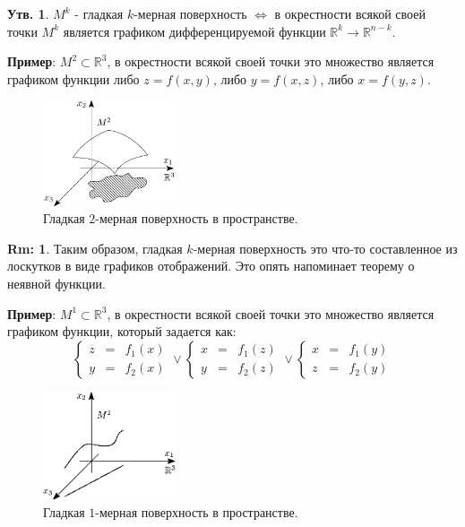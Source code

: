 \documentclass[12pt]{article}
\newcommand{\MR}{\mathbb{R}}
\theoremstyle{definition}
\newtheorem{rem}{Rm:}
\newtheorem{prop}{Утв.}
\begin{document}
\begin{prop}
	$M^k$ - гладкая $k$-мерная поверхность $\Leftrightarrow$ в окрестности всякой своей точки $M^k$ является графиком дифференцируемой функции $\MR^k \to \MR^{n-k}$.
\end{prop}
\textbf{Пример}: $M^2 \subset \MR^3$, в окрестности всякой своей точки это множество является графиком функции либо $z = f(x,y)$, либо $y = f(x,z)$, либо $x = f(y,z)$.
\begin{figure}[H]
	\centering
	\includegraphics[width=0.35\textwidth]{19_5.png}
	\caption{Гладкая $2$-мерная поверхность в пространстве.}
	\label{19_5}
\end{figure}
\begin{rem}
	Таким образом, гладкая $k$-мерная поверхность это что-то составленное из лоскутков в виде графиков отображений. Это опять напоминает теорему о неявной функции.
\end{rem}

\textbf{Пример}: $M^1 \subset \MR^3$, в окрестности всякой своей точки это множество является графиком функции, который задается как:
$$
	\left\{ 
		\begin{array}{ccc}
			z & = & f_1(x)\\
			y & = & f_2(x)
		\end{array}
	\right.
	\vee
	\left\{ 
		\begin{array}{ccc}
			x & = & f_1(z)\\
			y & = & f_2(z)
		\end{array}
	\right.
	\vee
	\left\{ 
		\begin{array}{ccc}
			x & = & f_1(y)\\
			z & = & f_2(y)
		\end{array}
	\right.
$$
\begin{figure}[H]
	\centering
	\includegraphics[width=0.35\textwidth]{19_6.eps}
	\caption{Гладкая $1$-мерная поверхность в пространстве.}
	\label{19_6}
\end{figure}
\end{document}
